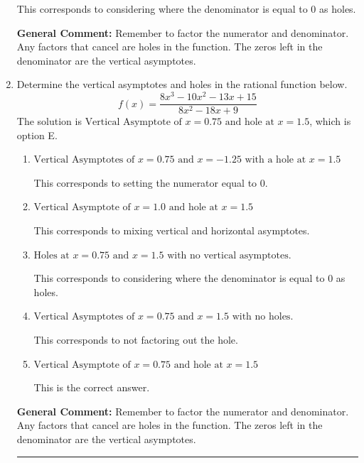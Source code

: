 \documentclass{extbook}[14pt]
\newcommand{\litem}[1]{\item #1

\rule{\textwidth}{0.4pt}}
\begin{document}
\begin{enumerate}
{\begin{enumerate}[label=\Alph*.]
This corresponds to considering where the denominator is equal to 0 as holes.
\end{enumerate}

\textbf{General Comment:} Remember to factor the numerator and denominator. Any factors that cancel are holes in the function. The zeros left in the denominator are the vertical asymptotes.
}
\litem{
Determine the vertical asymptotes and holes in the rational function below.
\[ f(x) = \frac{8x^{3} -10 x^{2} -13 x + 15}{8x^{2} -18 x + 9} \]The solution is \( \text{Vertical Asymptote of } x = 0.75 \text{ and hole at } x = 1.5 \), which is option E.\begin{enumerate}[label=\Alph*.]
\item \( \text{Vertical Asymptotes of } x = 0.75 \text{ and } x = -1.25 \text{ with a hole at } x = 1.5 \)

This corresponds to setting the numerator equal to 0.
\item \( \text{Vertical Asymptote of } x = 1.0 \text{ and hole at } x = 1.5 \)

This corresponds to mixing vertical and horizontal asymptotes.
\item \( \text{Holes at } x = 0.75 \text{ and } x = 1.5 \text{ with no vertical asymptotes.} \)

This corresponds to considering where the denominator is equal to 0 as holes.
\item \( \text{Vertical Asymptotes of } x = 0.75 \text{ and } x = 1.5 \text{ with no holes.} \)

This corresponds to not factoring out the hole.
\item \( \text{Vertical Asymptote of } x = 0.75 \text{ and hole at } x = 1.5 \)

This is the correct answer.
\end{enumerate}

\textbf{General Comment:} Remember to factor the numerator and denominator. Any factors that cancel are holes in the function. The zeros left in the denominator are the vertical asymptotes.
}
\end{enumerate}
\end{document}
